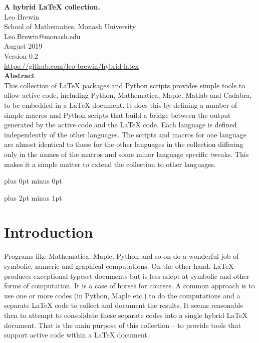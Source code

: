 \documentclass[12pt]{article}
\begin{document}


\begin{center}
   {\Large\bf A hybrid LaTeX collection.}\\[20pt]
   {Leo Brewin}\\[5pt]
   {School of Mathematics, Monash University}\\[5pt]
   {\tts Leo.Brewin@monash.edu}\\[5pt]
   {August 2019}\\[10pt]
   {Version 0.2}\\[10pt]
   {\href{https://github.com/leo-brewin/hybrid-latex}{https://github.com/leo-brewin/hybrid-latex}}\\[20pt]
   {\bf\small Abstract}\\[10pt]
   {\small{}%
      {This collection of LaTeX packages and Python scripts provides simple
      tools to allow active code, including Python, Mathematica, Maple, Matlab
      and Cadabra, to be embedded in a LaTeX document. It does this by defining
      a number of simple macros and Python scripts that build a bridge between
      the output generated by the active code and the LaTeX code. Each language
      is defined independently of the other languages. The scripts and macros
      for one language are almost identical to those for the other languages in
      the collection differing only in the names of the macros and some minor
      language specific tweaks.
      This makes it a simple matter to extend the collection to other languages.}}
\end{center}

\vskip 1cm

\parindent=0pt
\parskip=0pt plus 0pt minus 0pt

\tableofcontents

\vfill

\clearpage

\parindent=0pt
\parskip=8pt plus 2pt minus 1pt

\section{Introduction}

Programs like Mathematica, Maple, Python and so on do a wonderful job of symbolic,
numeric and graphical computations. On the other hand, LaTeX produces exceptional
typeset documents but is less adept at symbolic and other forms of computation. It
is a case of horses for courses. A common approach is to use one or more codes (in
Python, Maple etc.) to do the computations and a separate LaTeX code to collect and
document the results. It seems reasonable then to attempt to consolidate these
separate codes into a single hybrid LaTeX document. That is the main purpose of
this collection -- to provide tools that support active code within a LaTeX
document.
\end{document}
